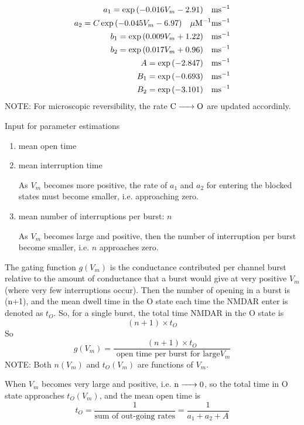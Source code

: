 \begin{eqnarray}
a_1 = \exp \left( -0.016 V_m - 2.91 \right)  \;\;\;\text{ms}^{-1} \\
a_2 = C \exp \left( -0.045 V_m - 6.97 \right) \;\;\;{\mu\text{M}}^{-1}\text{ms}^{-1}\\
b_1 = \exp \left( 0.009 V_m + 1.22 \right) \;\;\;\text{ms}^{-1}\\
b_2 = \exp \left( 0.017 V_m + 0.96 \right) \;\;\;\text{ms}^{-1}\\
A   = \exp \left( -2.847 \right) \;\;\;\text{ms}^{-1}\\
B_1  = \exp \left( -0.693\right) \;\;\;\text{ms}^{-1}\\
B_2 = \exp \left( -3.101 \right) \;\;\;\text{ms}^{-1}
\end{eqnarray}
NOTE: For microscopic reversibility, the rate $\ce{C ->O}$ are updated
accordinly.


Input for parameter estimations
\begin{enumerate}
  \item mean open time

  \item mean interruption time

As $V_m$ becomes more positive, the rate of $a_1$ and $a_2$ for entering the
blocked states must become smaller, i.e. approaching zero.


  \item mean number of interruptions per burst: $n$

As $V_m$ becomes large and positive, then the number of interruption per burst
become smaller, i.e. $n$ approaches zero.

\end{enumerate}
The gating function $g(V_m)$ is the conductance contributed per channel burst
relative to the amount of conductance that a burst would give at very positive
$V_m$ (where very few interruptions occur). Then the number of opening in a
burst is (n+1), and the mean dwell time in the O state each time the NMDAR
enter is denoted as $t_O$. So, for a single burst, the total time NMDAR in the O
state is
\begin{equation}
(n+1) \times t_O
\end{equation}
So
\begin{equation}
g(V_m) = \frac{(n+1)\times t_O }{\text{ open time per burst for large} V_m}
\end{equation}
NOTE: Both $n(V_m)$ and $t_O(V_m)$ are functions of $V_m$.

When $V_m$ becomes very large and positive, i.e. $\ce{n -> 0}$, so the total
time in O state approaches $t_O(V_m)$, and the mean open time is
\begin{equation}
t_O = \frac{1}{\text{sum of out-going rates}} = \frac{1}{a_1 + a_2 + A}
\end{equation}


